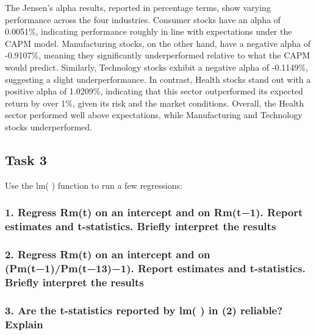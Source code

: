 \documentclass[
]{article}
\begin{document}
The Jensen's alpha results, reported in percentage terms, show varying
performance across the four industries. Consumer stocks have an alpha of
0.0051\%, indicating performance roughly in line with expectations under
the CAPM model. Manufacturing stocks, on the other hand, have a negative
alpha of -0.9107\%, meaning they significantly underperformed relative
to what the CAPM would predict. Similarly, Technology stocks exhibit a
negative alpha of -0.1149\%, suggesting a slight underperformance. In
contrast, Health stocks stand out with a positive alpha of 1.0209\%,
indicating that this sector outperformed its expected return by over
1\%, given its risk and the market conditions. Overall, the Health
sector performed well above expectations, while Manufacturing and
Technology stocks underperformed.

\hypertarget{task-3}{%
\subsection{Task 3}\label{task-3}}

Use the lm( ) function to run a few regressions:

\hypertarget{regress-rmt-on-an-intercept-and-on-rmt1.-report-estimates-and-t-statistics.-briefly-interpret-the-results}{%
\subsubsection{1. Regress Rm(t) on an intercept and on Rm(t−1). Report
estimates and t-statistics. Briefly interpret the
results}\label{regress-rmt-on-an-intercept-and-on-rmt1.-report-estimates-and-t-statistics.-briefly-interpret-the-results}}

\hypertarget{regress-rmt-on-an-intercept-and-on-pmt1pmt131.-report-estimates-and-t-statistics.-briefly-interpret-the-results}{%
\subsubsection{2. Regress Rm(t) on an intercept and on
(Pm(t−1)/Pm(t−13)−1). Report estimates and t-statistics. Briefly
interpret the
results}\label{regress-rmt-on-an-intercept-and-on-pmt1pmt131.-report-estimates-and-t-statistics.-briefly-interpret-the-results}}

\hypertarget{are-the-t-statistics-reported-by-lm-in-2-reliable-explain}{%
\subsubsection{3. Are the t-statistics reported by lm( ) in (2)
reliable?
Explain}\label{are-the-t-statistics-reported-by-lm-in-2-reliable-explain}}
\end{document}
